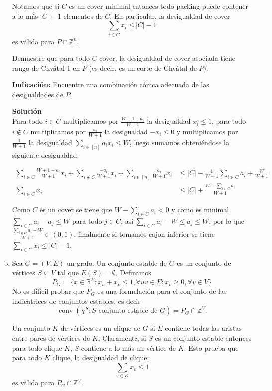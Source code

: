 \documentclass{article}
\newcommand{\RR}{\mathbb R}
\newcommand{\ZZ}{\mathbb Z}
\newcommand{\conv}{\operatorname{conv}}
\theoremstyle{plain}
\theoremstyle{definition}
\theoremstyle{Azul}
\begin{document}
\begin{enumerate}[(a)]
Notamos que si $C$ es un cover minimal entonces todo packing puede contener a lo más $|C|-1$ elementos de $C$. En particular, la desigualdad de cover 
$$\sum_{i\in C}x_i \leq |C|-1$$ 
es válida para $P\cap \ZZ^n$.

Demuestre que para todo $C$ cover, la desigualdad de cover asociada tiene rango de Chvátal 1 en $P$ (es decir, es un corte de Chvátal de $P$).

\textbf{Indicación:} Encuentre una combinación cónica adecuada de las desigualdades de $P$.

\textbf{Solución}\\

 Para todo $i\in C$ multiplicamos por $\frac{W+1-a_{i}}{W+1}$ la desigualdad $x_{i}\leq 1$, para todo $i\notin C$ multiplicamos por $\frac{a_{i}}{W+1}$ la desigualdad $-x_{i}\leq 0$  y multiplicamos por $\frac{1}{W+1}$ la desigualdad $\sum_{i\in[n]}a_{i}x_{i}\leq W$, luego sumamos obteniéndose la siguiente desigualdad:

\begin{align*}
	\sum_{i\in C}\frac{W+1-a_{i}}{W+1}x_{i}+\sum_{i\notin C}\frac{-a_{i}}{W+1}x_{i}+\sum_{i\in[n]}\frac{a_{i}}{W+1}x_{i}&\leq |C|-\frac{1}{W+1}\sum_{i\in C}a_{i}+\frac{W}{W+1}\\
	\sum_{i\in C}x_{i}&\leq |C|+\frac{W-\sum_{i\in C}a_{i}}{W+1}
\end{align*}

Como $C$ es un cover se tiene que $W-\sum_{i\in C}a_{i}<0$ y como es minimal $\sum_{i\in C}a_{i}-a_{j}\leq W$ para todo $j\in C$, así $\sum_{i\in C}a_{i}-W\leq a_{j}\leq W$, por lo que $\frac{\sum_{i\in C}a_{i}-W}{W+1} \in (0,1)$, finalmente si tomamos cajon inferior se tiene $\sum_{i\in C}x_{i}\leq |C|-1$. 

\item Sea $G=(V,E)$ un grafo. Un conjunto estable de $G$ es un conjunto de vértices $S\subseteq V$ tal que $E(S)=\emptyset$. Definamos 
$$P_G=\{x\in \RR^E\colon x_u+x_v\leq 1, \forall uv\in E; x_v\geq 0, \forall v\in V\}$$
No es difícil probar que $P_G$ es una formulación para el conjunto de las indicatrices de conjuntos estables, es decir
$$\conv(\chi^S\colon S\text{ conjunto estable de $G$})=P_G\cap \ZZ^V.$$

Un conjunto $K$ de vértices es un clique de $G$ si $E$ contiene todas las aristas entre pares de vértices de $K$. Claramente, si $S$ es un conjunto estable entonces para todo clique $K$, $S$ contiene a lo más un vértice de $K$. Esto prueba que para todo $K$ clique, la desigualdad de clique:
$$\sum_{v\in K}x_v \leq 1$$
es válida para $P_G\cap \ZZ^V$.


\end{enumerate}
\end{document}
